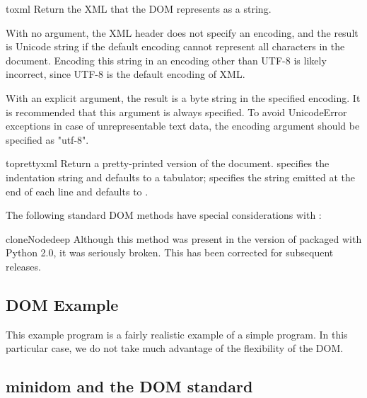 \begin{methoddesc}[Node]{toxml}{}
Return the XML that the DOM represents as a string.

With no argument, the XML header does not specify an encoding, and the
result is Unicode string if the default encoding cannot represent all
characters in the document. Encoding this string in an encoding other
than UTF-8 is likely incorrect, since UTF-8 is the default encoding of
XML.

With an explicit  argument, the result is a byte string
in the specified encoding. It is recommended that this argument is
always specified. To avoid UnicodeError exceptions in case of
unrepresentable text data, the encoding argument should be specified
as "utf-8".

\end{methoddesc}

\begin{methoddesc}[Node]{toprettyxml}{}
Return a pretty-printed version of the document.  specifies
the indentation string and defaults to a tabulator;  specifies
the string emitted at the end of each line and defaults to .

\end{methoddesc}

The following standard DOM methods have special considerations with
:

\begin{methoddesc}[Node]{cloneNode}{deep}
Although this method was present in the version of
 packaged with Python 2.0, it was seriously
broken.  This has been corrected for subsequent releases.
\end{methoddesc}


\subsection{DOM Example \label{dom-example}}

This example program is a fairly realistic example of a simple
program. In this particular case, we do not take much advantage
of the flexibility of the DOM.




\subsection{minidom and the DOM standard \label{minidom-and-dom}}

